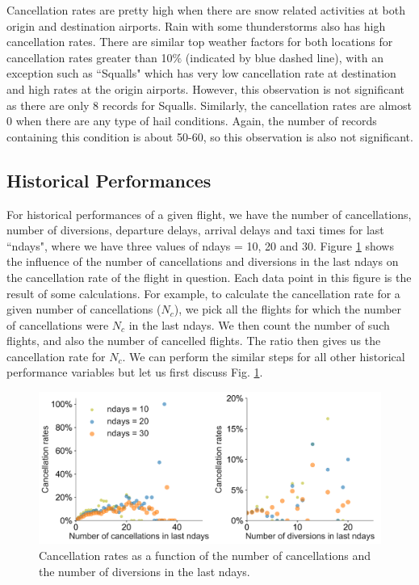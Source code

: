 \documentclass[12pt]{article}
\begin{document}
Cancellation rates are pretty high when there are snow related activities at both origin and destination airports. Rain with some thunderstorms also has high cancellation rates. There are similar top weather factors for both locations for cancellation rates greater than 10$\%$ (indicated by blue dashed line), with an exception such as ``Squalls" which has very low cancellation rate at destination and high rates at the origin airports. However, this observation is not significant as there are only 8 records for Squalls. Similarly, the cancellation rates are almost 0 when there are any type of hail conditions. Again, the number of records containing this condition is about 50-60, so this observation is also not significant.
\subsection{Historical Performances}
\label{subsec:historical}
For historical performances of a given flight, we have the number of cancellations, number of diversions, departure delays, arrival delays and taxi times for last ``ndays", where we have three values of ndays = 10, 20 and 30. Figure \ref{fig:candivcanrate} shows the influence of the number of cancellations and diversions in the last ndays on the cancellation rate of the flight in question. Each data point in this figure is the result of some calculations. For example, to calculate the cancellation rate for a given number of cancellations ($N_c$), we pick all the flights for which the number of cancellations were $N_c$ in the last ndays. We then count the number of such flights, and also the number of cancelled flights. The ratio then gives us the cancellation rate for $N_c$. We can perform the similar steps for all other historical performance variables but let us first discuss Fig. \ref{fig:candivcanrate}.
\begin{figure}[h!]
\begin{center}
\includegraphics[width=6in]{candiv_canrate.pdf}
\end{center}
\caption{\label{fig:candivcanrate}
Cancellation rates as a function of the number of cancellations and the number of diversions in the last ndays.}
\end{figure}
\end{document}
